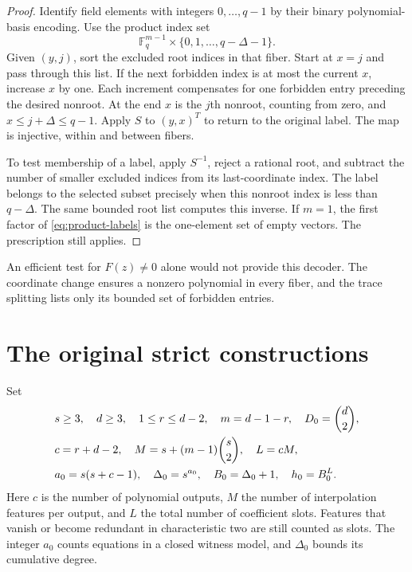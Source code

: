 \documentclass[11pt,a4paper]{article}
\newcommand{\F}{\mathbb F}
\theoremstyle{definition}
\theoremstyle{remark}
\numberwithin{equation}{section}
\begin{document}
\begin{proof}
Identify field elements with integers $0,\ldots,q-1$ by their binary polynomial-basis encoding. Use the product index set
\begin{equation}\label{eq:product-labels}
\F_q^{m-1}\times\{0,1,\ldots,q-\Delta-1\}.
\end{equation}
Given $(y,j)$, sort the excluded root indices in that fiber. Start at $x=j$ and pass through this list. If the next forbidden index is at most the current $x$, increase $x$ by one. Each increment compensates for one forbidden entry preceding the desired nonroot. At the end $x$ is the $j$th nonroot, counting from zero, and $x\le j+\Delta\le q-1$. Apply $S$ to $(y,x)^T$ to return to the original label. The map is injective, within and between fibers.

To test membership of a label, apply $S^{-1}$, reject a rational root, and subtract the number of smaller excluded indices from its last-coordinate index. The label belongs to the selected subset precisely when this nonroot index is less than $q-\Delta$. The same bounded root list computes this inverse. If $m=1$, the first factor of \eqref{eq:product-labels} is the one-element set of empty vectors. The prescription still applies.
\end{proof}

An efficient test for $F(z)\ne0$ alone would not provide this decoder. The coordinate change ensures a nonzero polynomial in every fiber, and the trace splitting lists only its bounded set of forbidden entries.

\section{The original strict constructions}\label{sec:original-statements}

Set
\begin{align}\label{eq:original-parameters}
&s\ge3,\quad d\ge3,\quad 1\le r\le d-2,\quad m=d-1-r,\quad D_0=\binom d2,\notag\\
&c=r+d-2,\quad M=s+(m-1)\binom s2,\quad L=cM,\notag\\
&a_0=s(s+c-1),\quad \Delta_0=s^{a_0},\quad B_0=\Delta_0+1,\quad h_0=B_0^L.
\end{align}
Here $c$ is the number of polynomial outputs, $M$ the number of interpolation features per output, and $L$ the total number of coefficient slots. Features that vanish or become redundant in characteristic two are still counted as slots. The integer $a_0$ counts equations in a closed witness model, and $\Delta_0$ bounds its cumulative degree.
\end{document}
